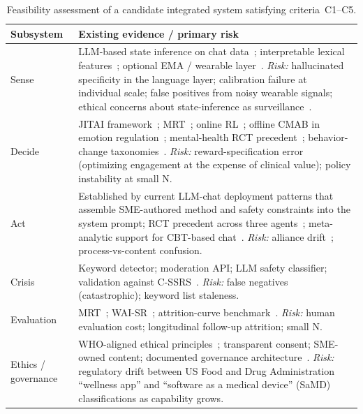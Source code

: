 \documentclass[11pt,a4paper]{article}
\begin{document}
\begin{table}[t]
\small
\begin{tabularx}{\textwidth}{l X}
\toprule
\textbf{Subsystem} & \textbf{Existing evidence / primary risk} \\
\midrule
Sense & LLM-based state inference on chat data~\cite{Xu2024MentalLLM,Stade2024LLMOppRisks};
interpretable lexical features~\cite{Walker2024InstagramSuicideLIWC,Boettcher2021RedditMHReview};
optional EMA / wearable layer~\cite{Trull2009ESMEMA,Versluis2016EMI,Sequeira2021PassiveSensing,Laborde2017HRV}.
\emph{Risk:} hallucinated specificity in the language layer;
calibration failure at individual scale; false positives from
noisy wearable signals; ethical concerns about state-inference as
surveillance~\cite{BirkSamuel2020DigitalPhenotypingCritique}. \\
Decide & JITAI framework~\cite{NahumShani2018JITAI};
MRT~\cite{Klasnja2015MRT,Liao2016MRTSampleSize}; online
RL~\cite{Liao2020PersonalizedHeartSteps}; offline CMAB in emotion
regulation~\cite{Ameko2020CMABEmotion}; mental-health RCT
precedent~\cite{Aguilera2024DIAMANTERL}; behavior-change
taxonomies~\cite{Michie2011BCW,Michie2013BCTTaxonomy}.
\emph{Risk:} reward-specification error (optimizing engagement at
the expense of clinical value); policy instability at small N. \\
Act & Established by current LLM-chat deployment patterns that
assemble SME-authored method and safety constraints into the system
prompt; RCT precedent
across three agents~\cite{Fitzpatrick2017Woebot,Inkster2018Wysa,Heinz2025TherabotRCT};
meta-analytic support for CBT-based chat~\cite{Linardon2019Meta}.
\emph{Risk:} alliance drift~\cite{Henson2019DTA,MalouinLachance2025DTAReview};
process-vs-content confusion. \\
Crisis & Keyword detector; moderation API; LLM safety classifier;
validation against C-SSRS~\cite{Posner2011CSSRS}.
\emph{Risk:} false negatives (catastrophic); keyword list staleness. \\
Evaluation & MRT~\cite{Klasnja2015MRT,Liao2016MRTSampleSize,Luers2018StandardizedEffect,Seewald2019MRTData};
WAI-SR~\cite{Hatcher2006WAISR}; attrition-curve
benchmark~\cite{Linardon2020Attrition}.
\emph{Risk:} human evaluation cost; longitudinal follow-up
attrition; small N. \\
Ethics / governance & WHO-aligned ethical
principles~\cite{MartinezMartin2021DigitalPhenotypingEthics,MartinezMartin2020COVIDDigitalMHEthics};
transparent consent; SME-owned content; documented governance
architecture~\cite{vanHeerden2023LLMGlobalMH}. \emph{Risk:}
regulatory drift between US Food and Drug Administration ``wellness
app'' and ``software as a medical device'' (SaMD) classifications
as capability grows. \\
\bottomrule
\end{tabularx}
\caption{Feasibility assessment of a candidate integrated system
satisfying criteria~C1--C5.}
\label{tab:feasibility}
\end{table}
\end{document}

